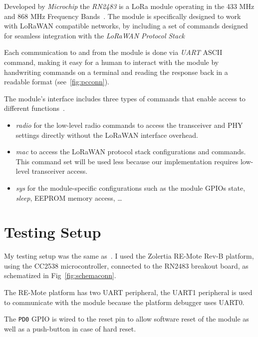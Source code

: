 Developed by \emph{Microchip} the \emph{RN2483} is a LoRa module operating in
the 433 MHz and 868 MHz Frequency Bands~\cite{microchip:rn2483}. 
The module is specifically designed to work with LoRaWAN compatible networks, 
by including a set of commands designed for seamless integration with the
\emph{LoRaWAN Protocol Stack}

Each communication to and from the module is done via \emph{UART} ASCII command,
making it easy for a human to interact with the module by handwriting commands
on a terminal and reading the response back in a readable format
(see~\ref{fig:pcconn}).



The module's interface includes three types of commands that enable access to
different functions~\cite{microchip:reference}.

\begin{itemize}
  \item \emph{radio} for the low-level radio commands to access the transceiver
    and PHY settings directly without the LoRaWAN interface overhead.
  \item \emph{mac} to access the LoRaWAN protocol stack configurations and
    commands. This command set will be used less because our implementation
    requires low-level transceiver access.
  \item \emph{sys} for the module-specific configurations such as the module
    GPIOs state, \emph{sleep}, EEPROM memory access, \ldots
\end{itemize}

\section{Testing Setup}

My testing setup was the same as~\cite{8847137}. I used the Zolertia RE-Mote
Rev-B platform, using the CC2538 microcontroller, connected to the
RN2483 breakout board, as schematized in Fig~\ref{fig:schemaconn}. 

The RE-Mote platform has two UART peripheral, the UART1 peripheral is used
to communicate with the module because the platform debugger uses UART0.

The \lstinline{PD0} GPIO is wired to the reset pin to allow
software reset of the module as well as a push-button in case of hard reset.


